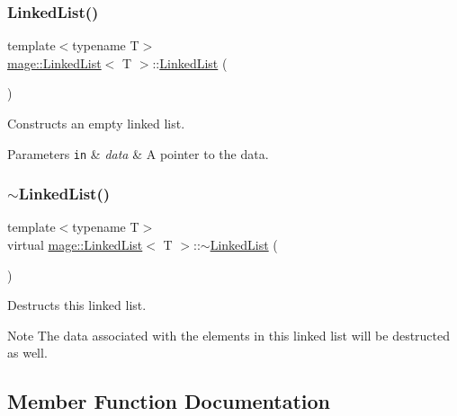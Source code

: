 \subsubsection{\texorpdfstring{Linked\+List()}{LinkedList()}}
{\footnotesize\ttfamily template$<$typename T$>$ \\
\hyperlink{classmage_1_1_linked_list}{mage\+::\+Linked\+List}$<$ T $>$\+::\hyperlink{classmage_1_1_linked_list}{Linked\+List} (\begin{DoxyParamCaption}{ }\end{DoxyParamCaption})}

Constructs an empty linked list.


\begin{DoxyParams}[1]{Parameters}
\mbox{\tt in}  & {\em data} & A pointer to the data. \\
\hline
\end{DoxyParams}
\hypertarget{classmage_1_1_linked_list_a88cb2ec52e90f3658d9735b4948cccdb}{}\label{classmage_1_1_linked_list_a88cb2ec52e90f3658d9735b4948cccdb} 
\subsubsection{\texorpdfstring{$\sim$\+Linked\+List()}{~LinkedList()}}
{\footnotesize\ttfamily template$<$typename T$>$ \\
virtual \hyperlink{classmage_1_1_linked_list}{mage\+::\+Linked\+List}$<$ T $>$\+::$\sim$\hyperlink{classmage_1_1_linked_list}{Linked\+List} (\begin{DoxyParamCaption}{ }\end{DoxyParamCaption})\hspace{0.3cm}{\ttfamily [virtual]}}

Destructs this linked list.

\begin{DoxyNote}{Note}
The data associated with the elements in this linked list will be destructed as well. 
\end{DoxyNote}


\subsection{Member Function Documentation}
\hypertarget{classmage_1_1_linked_list_ac6cd236aab89f296d3c112c05b2337e2}{}\label{classmage_1_1_linked_list_ac6cd236aab89f296d3c112c05b2337e2} 

